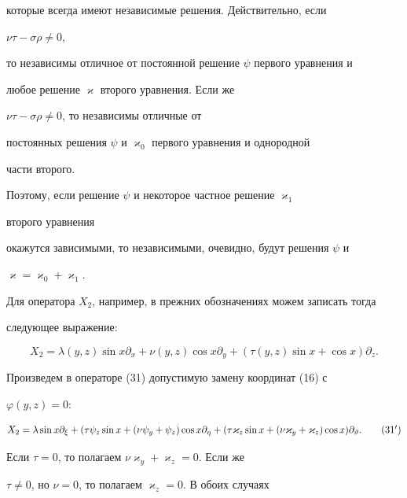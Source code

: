 которые всегда имеют независимые решения. Действительно, если 


$\nu\tau-\sigma\rho\ne 0$, 


то независимы отличное от постоянной решение $\psi$ первого уравнения и 


любое решение $\varkappa$ второго уравнения. Если же 


$\nu\tau-\sigma\rho\ne 0$, то независимы отличные от 


постоянных решения $\psi$ и $\varkappa_0$ первого уравнения и однородной 


части второго. 


Поэтому, если решение $\psi$ и некоторое частное решение $\varkappa_1$ 


второго уравнения 


окажутся зависимыми, то независимыми, очевидно, будут решения $\psi$ и 


$\varkappa=\varkappa_0+\varkappa_1$. 


Для оператора $X_2$, например, в прежних обозначениях можем записать тогда 


следующее выражение: 


\begin{equation} 


X_2=\lambda(y,z)\sin x\partial_x+ 


\nu(y,z)\cos x\partial_y+ 


(\tau(y,z)\sin x+\cos x)\partial_z. 


\end{equation} 


 


Произведем в операторе (31) допустимую замену координат (16) с 


$\varphi(y,z)=0$: 


\begin{equation} 


X_2=\lambda\sin x\partial_\xi+(\tau\psi_z\sin x+ 


(\nu\psi_y+\psi_z)\cos x\partial_\eta+ 


(\tau\varkappa_z\sin x+(\nu\varkappa_y+\varkappa_z) 


\cos x)\partial_\vartheta.\tag{31${}'$} 


\end{equation} 


Если $\tau=0$, то полагаем $\nu\varkappa_y+\varkappa_z=0$. Если же 


$\tau\ne 0$, но $\nu=0$, то полагаем $\varkappa_z=0$. В обоих случаях 


